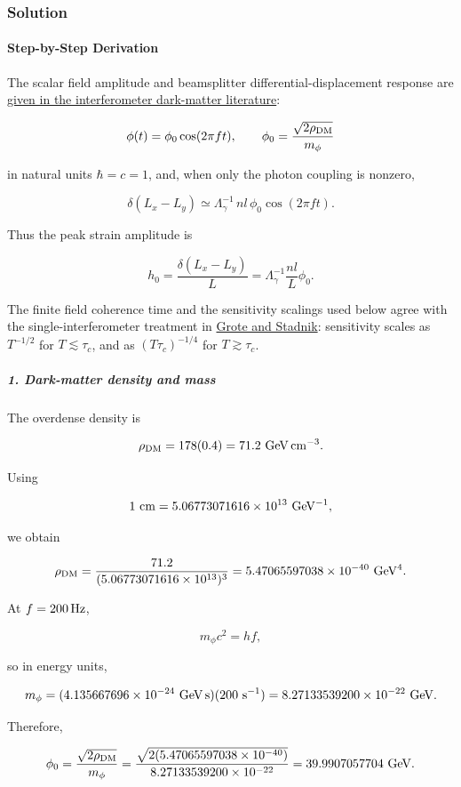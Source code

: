 \subsubsection*{Solution}
\paragraph*{Step-by-Step Derivation}

The scalar field amplitude and beamsplitter differential-displacement response are \href{\detokenize{https://link.aps.org/accepted/10.1103/PhysRevD.105.103035}}{given in the interferometer dark-matter literature}:

\[
\phi(t)=\phi_0\cos(2\pi f t), \qquad \phi_0=\frac{\sqrt{2\rho_{\rm DM}}}{m_\phi}
\]

in natural units $\hbar=c=1$, and, when only the photon coupling is nonzero,

\[
\delta(L_x-L_y) \simeq \Lambda_\gamma^{-1}\,n l\,\phi_0\cos(2\pi f t).
\]

Thus the peak strain amplitude is

\[
h_0=\frac{\delta(L_x-L_y)}{L} =\Lambda_\gamma^{-1}\frac{nl}{L}\phi_0.
\]

The finite field coherence time and the sensitivity scalings used below agree with the single-interferometer treatment in \href{\detokenize{https://arxiv.org/pdf/1906.06193}}{Grote and Stadnik}: sensitivity scales as $T^{-1/2}$ for $T\lesssim\tau_c$, and as $(T\tau_c)^{-1/4}$ for $T\gtrsim\tau_c$.

\subparagraph*{1. Dark-matter density and mass}

The overdense density is

\[
\rho_{\rm DM}=178(0.4) =71.2\ {\rm GeV\,cm^{-3}}.
\]

Using

\[
1\ {\rm cm}=5.06773071616\times10^{13}\ {\rm GeV^{-1}},
\]

we obtain

\[
\rho_{\rm DM} = \frac{71.2}{(5.06773071616\times10^{13})^3} = 5.47065597038\times10^{-40}\ {\rm GeV^4}.
\]

At $f=200\,{\rm Hz}$,

\[
m_\phi c^2=hf,
\]

so in energy units,

\[
m_\phi = (4.135667696\times10^{-24}\ {\rm GeV\,s})(200\ {\rm s^{-1}}) = 8.27133539200\times10^{-22}\ {\rm GeV}.
\]

Therefore,

\[
\phi_0 = \frac{\sqrt{2\rho_{\rm DM}}}{m_\phi} = \frac{\sqrt{2(5.47065597038\times10^{-40})}} {8.27133539200\times10^{-22}} = 39.9907057704\ {\rm GeV}.
\]

